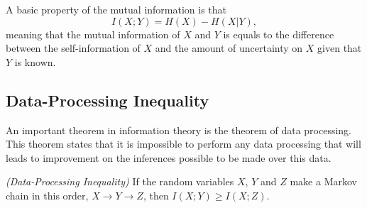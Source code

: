 A basic property of the mutual information is that 
\begin{equation}
I(X;Y) = H(X) - H(X|Y),
\end{equation}
meaning that the mutual information of $X$ and $Y$ is equals to the difference between the
self-information of $X$ and the amount of uncertainty on $X$ given that $Y$ is known.


\subsection{Data-Processing Inequality}
An important theorem in information theory is the theorem of data processing. 
This theorem states that it is impossible to perform any data processing that will 
leads to improvement on the inferences possible to be made over this data. 

\begin{theorem}
\emph{(Data-Processing Inequality)}
\label{data-processing-inequality}
If the random variables $X$, $Y$ and $Z$ make a Markov chain in this order, 
$X \rightarrow Y \rightarrow Z$, then $I(X;Y) \geq I(X;Z)$. 
\end{theorem}

